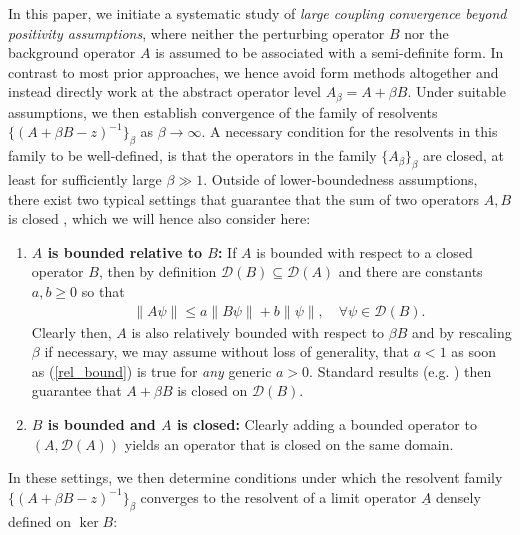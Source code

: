 \documentclass[reqno,12pt,letterpaper]{amsart}
\numberwithin{equation}{section}
\newcommand{\1}{\mathds{1}}
\theoremstyle{definition}
\begin{document}
\medskip

	In this paper, we initiate a systematic study of \emph{large coupling convergence beyond positivity assumptions}, where neither the perturbing operator \( B \) nor the background operator \( A \) is assumed to be associated with a semi-definite form. In contrast to most prior approaches, we hence avoid form methods altogether and instead directly work at the abstract operator level $A_\beta = A + \beta B$.	
	Under suitable assumptions, we then establish convergence of the family of resolvents $\{(A + \beta B -z)^{-1}\}_\beta$ as $\beta \rightarrow \infty$. A necessary condition for the resolvents in this family to be well-defined, is that the operators in the family  $\{A_\beta\}_\beta$ are closed, at least for sufficiently large $\beta \gg 1$. Outside of lower-boundedness assumptions, there exist two typical settings that guarantee that the sum of two operators $A,B$ is closed  \cite{kato1995perturbation, teschl2014mathematical}, which we will hence also consider here:
	\begin{enumerate}
		\item \textbf{$A$ is bounded  relative to $B$:} If $A$ is bounded with respect to a closed operator $B$, then by definition $\mathcal{D}(B) \subseteq \mathcal{D}(A)$ and  there are constants $a,b \geq 0$ so that 	
	\begin{align}\label{rel_bound}
		\quad \|A\psi\| \leq  a\| B \psi\| + b \|\psi\|, \quad \forall \psi \in \mathcal{D}(B).
	\end{align}
	Clearly then, $A$ is also relatively bounded with respect to $\beta B$ and by rescaling $\beta$ if necessary, we may assume without loss of generality, that  $a < 1$ as soon as  (\ref{rel_bound}) is true for \textit{any} generic $a > 0$. Standard results (e.g. \cite[Theorem IV.1.1]{kato1995perturbation}) then 
	guarantee that $A + \beta B$ is closed on $\mathcal{D}(B)$.
\item
	\textbf{$B$ is bounded  and $A$ is closed:} Clearly adding a bounded operator to $(A,\mathcal{D}(A))$ yields an operator that is closed on the same domain.
\end{enumerate}
In these settings, we then  determine conditions under which the resolvent family $\{(A + \beta B -z)^{-1}\}_\beta$ converges to the resolvent of a limit operator $\underline{A}$ densely defined on $\ker{B}$:
\end{document}
